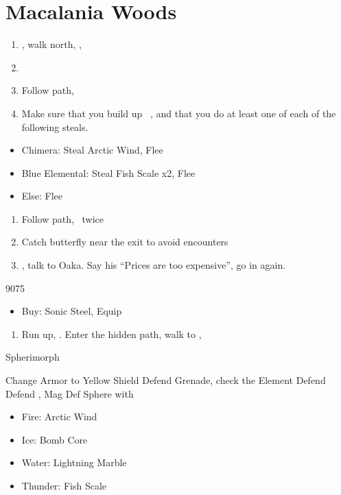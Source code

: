 \chapter{Macalania Woods}

\begin{enumerate}
  \item \sd, walk north, \sd, \save
  \item \formation{\tidus}{\rikku}{\auron}
  \item Follow path, 
  \item Make sure that you build up \rikku\ \od, and that you do at least one of each of the following steals.
\end{enumerate}
\begin{encounters}
  \begin{itemize}
    \item Chimera: Steal Arctic Wind, Flee
    \item Blue Elemental: Steal Fish Scale x2, Flee
    \item Else: Flee
  \end{itemize}
\end{encounters}
\begin{enumerate}[resume]
  \item Follow path, \sd\ twice
  \item Catch butterfly near the exit to avoid encounters
        \formation{\tidus}{\yuna}{\kimahri}
  \item \save, talk to Oaka. Say his ``Prices are too expensive'', go in again.
\end{enumerate}
\begin{shop}{9075}
  \begin{itemize}
    \item Buy: Sonic Steel, Equip
  \end{itemize}
\end{shop}
\begin{enumerate}[resume]
  \item Run up, \sd. Enter the hidden path, walk to \auron, \sd
\end{enumerate}
\begin{battle}[12000]{Spherimorph}
  \begin{itemize}
    \tidusf Change Armor to Yellow Shield
    \tidusf Defend
    \switch{\tidus}{\rikku}
    \rikkuf Grenade, check the Element
    \kimahrif Defend
    \yunaf Defend
    \rikkuf \od, Mag Def Sphere with
    \begin{itemize}
      \item Fire: Arctic Wind
      \item Ice: Bomb Core
      \item Water: Lightning Marble
      \item Thunder: Fish Scale
    \end{itemize}
  \end{itemize}
\end{battle}

